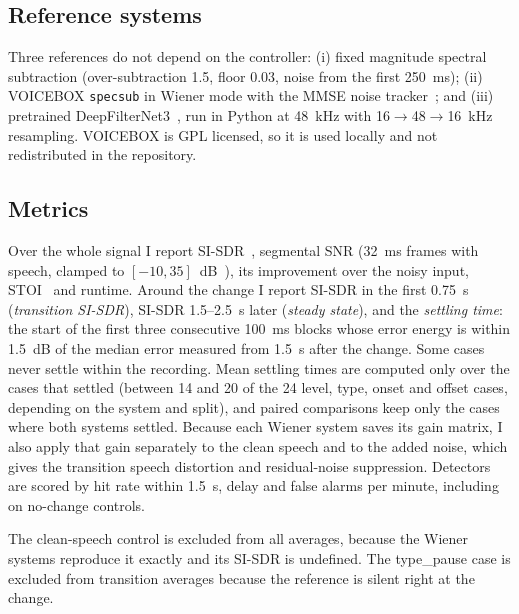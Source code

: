 \documentclass[10pt,conference,a4paper]{IEEEtran}
\begin{document}
\subsection{Reference systems}
Three references do not depend on the controller: (i) fixed magnitude spectral
subtraction (over-subtraction 1.5, floor 0.03, noise from the first 250~ms);
(ii) VOICEBOX \texttt{specsub} in Wiener mode with the MMSE noise
tracker~\cite{gerkmann2012unbiased,brookes_voicebox}; and (iii) pretrained
DeepFilterNet3~\cite{schroter2023deepfilternet}, run in Python at 48~kHz with
16$\to$48$\to$16~kHz resampling. VOICEBOX is GPL licensed, so it is used locally
and not redistributed in the repository.

\subsection{Metrics}
Over the whole signal I report SI-SDR~\cite{leroux2019sdr}, segmental SNR (32~ms
frames with speech, clamped to $[-10,35]$~dB~\cite{loizou2013speech}), its
improvement over the noisy input, STOI~\cite{taal2011stoi} and runtime. Around
the change I report SI-SDR in the first 0.75~s (\emph{transition SI-SDR}),
SI-SDR 1.5--2.5~s later (\emph{steady state}), and the \emph{settling time}: the
start of the first three consecutive 100~ms blocks whose error energy is within
1.5~dB of the median error measured from 1.5~s after the change. Some cases never
settle within the recording. Mean settling times are computed only over the
cases that settled (between 14 and 20 of the 24 level, type, onset and offset
cases, depending on the system and split), and paired comparisons keep only the
cases where both systems settled. Because each
Wiener system saves its gain matrix, I also apply that gain separately to the
clean speech and to the added noise, which gives the transition speech
distortion and residual-noise suppression. Detectors are scored by hit rate
within 1.5~s, delay and false alarms per minute, including on no-change
controls.

The clean-speech control is excluded from all averages, because the Wiener
systems reproduce it exactly and its SI-SDR is undefined. The type\_pause case is
excluded from transition averages because the reference is silent right at the
change.
\end{document}
